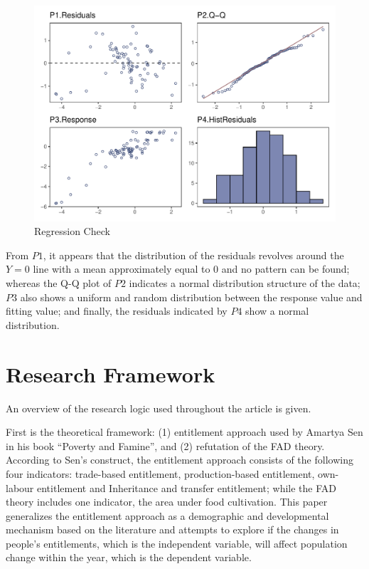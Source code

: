 \begin{figure}[h]
    \centering
    \caption{Regression Check}
    \includegraphics[width=.9\textwidth]{../03_outputs/regcheck.pdf}
\end{figure}
\vspace{-7pt}

From $P1$, it appears that the distribution of the residuals revolves around the $Y=0$ line with a mean approximately equal to 0 and no pattern can be found; whereas the Q-Q plot of $P2$ indicates a normal distribution structure of the data; $P3$ also shows a uniform and random distribution between the response value and fitting value; and finally, the residuals indicated by $P4$ show a normal distribution.

\section{Research Framework}

An overview of the research logic used throughout the article is given.

First is the theoretical framework: (1) entitlement approach used by Amartya Sen in his book ``Poverty and Famine'', and (2) refutation of the FAD theory. According to Sen's construct, the entitlement approach consists of the following four indicators: trade-based entitlement, production-based entitlement, own-labour entitlement and Inheritance and transfer entitlement; while the FAD theory includes one indicator, the area under food cultivation. This paper generalizes the entitlement approach as a demographic and developmental mechanism based on the literature and attempts to explore if the changes in people's entitlements, which is the independent variable, will affect population change within the year, which is the dependent variable.

